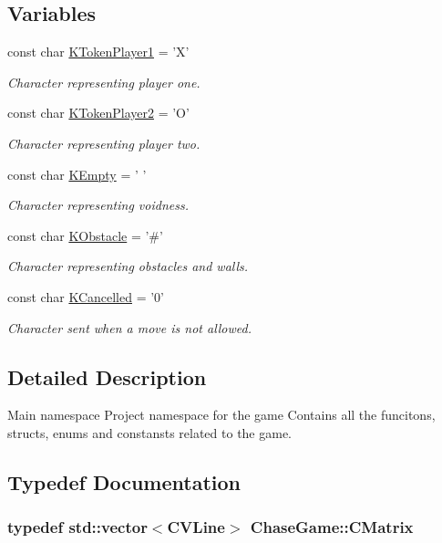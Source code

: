 \subsection*{Variables}
\begin{DoxyCompactItemize}
\item 
const char \hyperlink{namespace_chase_game_a8452e2d6de618e4ca7a9f76b082b52a4}{K\-Token\-Player1} = 'X'
\begin{DoxyCompactList}\small\item\em Character representing player one. \end{DoxyCompactList}\item 
const char \hyperlink{namespace_chase_game_ae27343407c21a8d6e3cf26b736bd5527}{K\-Token\-Player2} = 'O'
\begin{DoxyCompactList}\small\item\em Character representing player two. \end{DoxyCompactList}\item 
const char \hyperlink{namespace_chase_game_aa036d4de40188ba2e1aa36ab6cfaf1da}{K\-Empty} = ' '
\begin{DoxyCompactList}\small\item\em Character representing voidness. \end{DoxyCompactList}\item 
const char \hyperlink{namespace_chase_game_ad86181b2050b912dab9d69d2f0bea76e}{K\-Obstacle} = '\#'
\begin{DoxyCompactList}\small\item\em Character representing obstacles and walls. \end{DoxyCompactList}\item 
const char \hyperlink{namespace_chase_game_a12d6411bb9a72150acba6060bb1587e1}{K\-Cancelled} = '0'
\begin{DoxyCompactList}\small\item\em Character sent when a move is not allowed. \end{DoxyCompactList}\end{DoxyCompactItemize}


\subsection{Detailed Description}
Main namespace Project namespace for the game Contains all the funcitons, structs, enums and constansts related to the game. 

\subsection{Typedef Documentation}
\hypertarget{namespace_chase_game_a469449f9237e59efce3982127366c550}{
\subsubsection[{C\-Matrix}]{\setlength{\rightskip}{0pt plus 5cm}typedef std\-::vector$<${\bf C\-V\-Line}$>$ {\bf Chase\-Game\-::\-C\-Matrix}}}\label{namespace_chase_game_a469449f9237e59efce3982127366c550}


